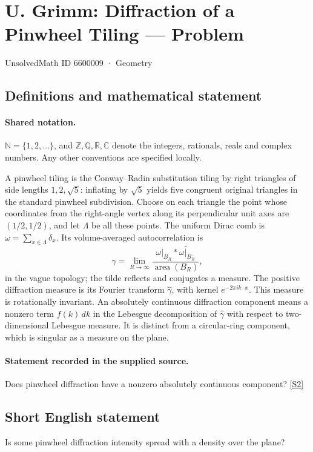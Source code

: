 \documentclass[11pt]{article}
\newcommand{\sref}[2]{\hyperlink{source:#1:#2}{[S#2]}}
\begin{document}
\setcounter{section}{6600008}
\section{U. Grimm: Diffraction of a Pinwheel Tiling — Problem}\label{6600009}
{\small\sffamily UnsolvedMath ID 6600009 · Geometry}
\subsection{Definitions and mathematical statement}

\paragraph{Shared notation.}$\mathbb N=\{1,2,\ldots\}$, and $\mathbb Z,\mathbb Q,\mathbb R,\mathbb C$ denote the integers, rationals, reals and complex numbers. Any other conventions are specified locally.


A pinwheel tiling is the Conway--Radin substitution tiling by right triangles of side lengths $1,2,\sqrt5$: inflating by $\sqrt5$ yields five congruent original triangles in the standard pinwheel subdivision. Choose on each triangle the point whose coordinates from the right-angle vertex along its perpendicular unit axes are $(1/2,1/2)$, and let $\Lambda$ be all these points. The uniform Dirac comb is $\omega=\sum_{x\in\Lambda}\delta_x$. Its volume-averaged autocorrelation is
\[\gamma=\lim_{R\to\infty}\frac{\omega|_{B_R}*\widetilde{\omega|_{B_R}}}{\operatorname{area}(B_R)},\]
in the vague topology; the tilde reflects and conjugates a measure. The positive diffraction measure is its Fourier transform $\widehat\gamma$, with kernel $e^{-2\pi i k\cdot x}$. This measure is rotationally invariant. An absolutely continuous diffraction component means a nonzero term $f(k)\,dk$ in the Lebesgue decomposition of $\widehat\gamma$ with respect to two-dimensional Lebesgue measure. It is distinct from a circular-ring component, which is singular as a measure on the plane.
\paragraph{Statement recorded in the supplied source.}
Does pinwheel diffraction have a nonzero absolutely continuous component? \sref{6600009}{2}
\subsection{Short English statement}
Is some pinwheel diffraction intensity spread with a density over the plane?
\end{document}
